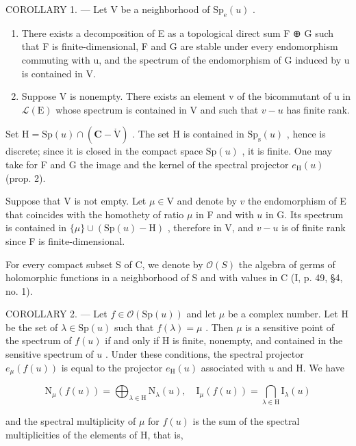 COROLLARY 1. --- Let V be a neighborhood of \(\mathrm{Sp_e}(u)\) .

\begin{enumerate}
\def\labelenumi{\alph{enumi})}
\item
  There exists a decomposition of E as a topological direct sum F ⊕ G such that F is finite-dimensional, F and G are stable under every endomorphism commuting with u, and the spectrum of the endomorphism of G induced by u is contained in V.
\item
  Suppose V is nonempty. There exists an element v of the bicommutant of u in \(\mathcal{L}(\mathrm{E})\) whose spectrum is contained in V and such that \(v - u\) has finite rank.
\end{enumerate}

Set \(\mathrm{H} = \mathrm{Sp}(u) \cap (\mathbf{C} - \mathring{\mathrm{V}})\) . The set H is contained in \(\mathrm{Sp}_{\mathrm{s}}(u)\) , hence is discrete; since it is closed in the compact space \(\mathrm{Sp}(u)\) , it is finite. One may take for F and G the image and the kernel of the spectral projector \(e_{\mathrm{H}}(u)\) (prop. 2).

Suppose that V is not empty. Let \(\mu\in\mathrm{V}\) and denote by \(v\) the endomorphism of E that coincides with the homothety of ratio \(\mu\) in F and with \(u\) in G. Its spectrum is contained in \(\{\mu\}\cup(\mathrm{Sp}(u)-\mathrm{H})\) , therefore in V, and \(v-u\) is of finite rank since F is finite-dimensional.

For every compact subset S of C, we denote by \(\mathcal{O}(S)\) the algebra of germs of holomorphic functions in a neighborhood of S and with values in C (I, p. 49, §4, no. 1).

COROLLARY 2. --- Let \(f \in \mathcal{O}(\mathrm{Sp}(u))\) and let \(\mu\) be a complex number. Let H be the set of \(\lambda \in \mathrm{Sp}(u)\) such that \(f(\lambda) = \mu\) . Then \(\mu\) is a sensitive point of the spectrum of \(f(u)\) if and only if H is finite, nonempty, and contained in the sensitive spectrum of \(u\) . Under these conditions, the spectral projector \(e_{\mu}(f(u))\) is equal to the projector \(e_{\mathrm{H}}(u)\) associated with \(u\) and H. We have

\[
\mathrm{N} _ {\mu} (f (u)) = \bigoplus_ {\lambda \in \mathrm{H}} \mathrm{N} _ {\lambda} (u), \quad \mathrm{I} _ {\mu} (f (u)) = \bigcap_ {\lambda \in \mathrm{H}} \mathrm{I} _ {\lambda} (u)
\]

and the spectral multiplicity of \(\mu\) for \(f(u)\) is the sum of the spectral multiplicities of the elements of H, that is,

